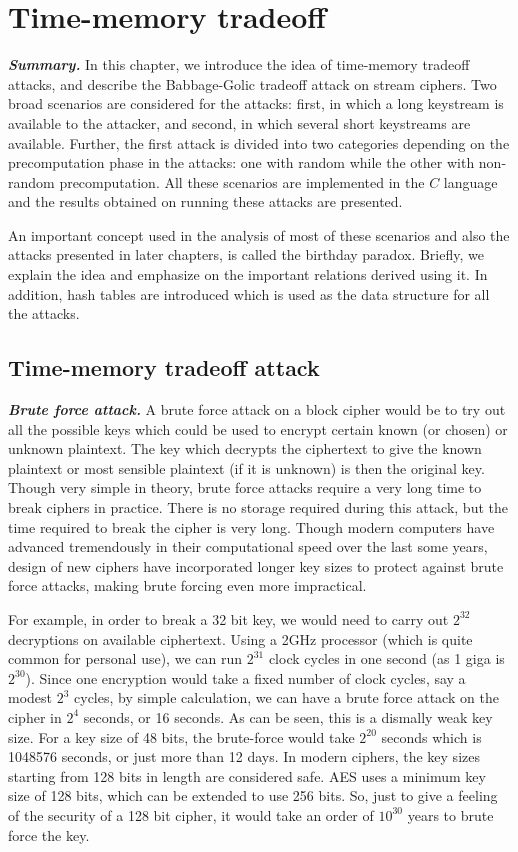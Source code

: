\chapter{Time-memory tradeoff}

\indent \textbf{\textit{Summary.}} In this chapter, we introduce the idea of time-memory tradeoff attacks, and describe the Babbage-Golic tradeoff attack on stream ciphers. Two broad scenarios are considered for the attacks: first, in which a long keystream is available to the attacker, and second, in which several short keystreams are available. Further, the first attack is divided into two categories depending on the precomputation phase in the attacks: one with random while the other with non-random precomputation. All these scenarios are implemented in the $C$ language and the results obtained on running these attacks are presented. 

An important concept used in the analysis of most of these scenarios and also the attacks presented in later chapters, is called the birthday paradox. Briefly, we explain the idea and emphasize on the important relations derived using it. In addition, hash tables are introduced which is used as the data structure for all the attacks. 

\section{Time-memory tradeoff attack}

\noindent \textit{\textbf{Brute force attack.}} A brute force attack on a block cipher would be to try out all the possible keys which could be used to encrypt certain known (or chosen) or unknown plaintext. The key which decrypts the ciphertext to give the known plaintext or most sensible plaintext (if it is unknown) is then the original key. Though very simple in theory, brute force attacks require a very long time to break ciphers in practice. There is no storage required during this attack, but the time required to break the cipher is very long. Though modern computers have advanced tremendously in their computational speed over the last some years, design of new ciphers have incorporated longer key sizes to protect against brute force attacks, making brute forcing even more impractical.

For example, in order to break a 32 bit key, we would need to carry out $2^{32}$ decryptions on available ciphertext. Using a 2GHz processor (which is quite common for personal use), we can run $2^{31}$ clock cycles in one second (as 1 giga is $2^{30}$). Since one encryption would take a fixed number of clock cycles, say a modest $2^3$ cycles, by simple calculation, we can have a brute force attack on the cipher in $2^4$ seconds, or 16 seconds. As can be seen, this is a dismally weak key size. For a key size of 48 bits, the brute-force would take $2^{20}$ seconds which is 1048576 seconds, or just more than 12 days. In modern ciphers, the key sizes starting from 128 bits in length are considered safe. AES uses a minimum key size of 128 bits, which can be extended to use 256 bits. So, just to give a feeling of the security of a 128 bit cipher, it would take an order of $10^{30}$ years to brute force the key.\\

